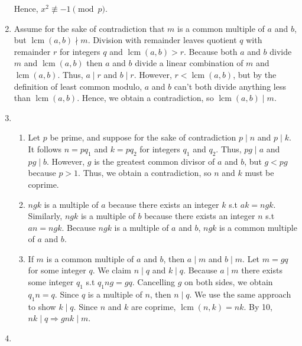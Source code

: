 \documentclass[10pt]{article}
\DeclareMathOperator*{\lcm}{lcm}
\begin{document}
\begin{enumerate}[label= \arabic*.]
    Hence, $x^2\not\equiv -1\pmod{p}$.
    \item Assume for the sake of contradiction that $m$ is a common multiple of $a$ and $b$, but $\lcm(a,b)\nmid m$.
    Division with remainder leaves quotient $q$ with remainder $r$ for integers $q$ and $\lcm(a,b)>r$.
    Because both $a$ and $b$ divide $m$ and $\lcm(a,b)$ then $a$ and $b$ divide a linear combination of $m$ and $\lcm(a,b)$. 
    Thus, $a\mid r$ and $b\mid r$.
    However, $r<\lcm(a,b)$, but by the definition of least common modulo, $a$ and $b$ can't both divide anything less than $\lcm(a,b)$.
    Hence, we obtain a contradiction, so $\lcm(a,b)\mid m$.
    \item \begin{enumerate}
        \item Let $p$ be prime, and suppose for the sake of contradiction $p\mid n$ and $p\mid k$. 
        It follows $n=pq_1$ and $k=pq_2$ for integers $q_1$ and $q_2$.
        Thus, $pg\mid a$ and $pg\mid b$. 
        However, $g$ is the greatest common divisor of $a$ and $b$, but $g<pg$ because $p>1$.
        Thus, we obtain a contradiction, so $n$ and $k$ must be coprime.
        \item $ngk$ is a multiple of $a$ because there exists an integer $k$ s.t $ak=ngk$. 
        Similarly, $ngk$ is a multiple of $b$ because there exists an integer $n$ s.t $an=ngk$.
        Because $ngk$ is a multiple of $a$ and $b$, $ngk$ is a common multiple of $a$ and $b$.
        \item If $m$ is a common multiple of $a$ and $b$, then $a\mid m$ and $b\mid m$. 
        Let $m=gq$ for some integer $q$. 
        We claim $n\mid q$ and $k\mid q$.
        Because $a\mid m$ there exists some integer $q_1$ s.t $q_1ng=gq$.
        Cancelling $g$ on both sides, we obtain $q_1n=q$. 
        Since $q$ is a multiple of $n$, then $n\mid q$.
        We use the same approach to show $k\mid q$.
        Since $n$ and $k$ are coprime, $\lcm(n,k)=nk$.
        By 10, $nk\mid q\Rightarrow gnk\mid m$.
    \end{enumerate}
    \item  %

\end{enumerate}
\end{document}
